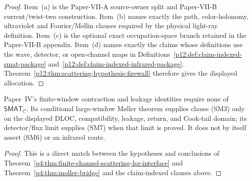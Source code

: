 \documentclass[12pt,a4paper]{article}
\begin{document}
\begin{proof}
Item~(a) is the Paper-VII-A source-owner split and Paper-VII-B current/twist-two
construction.  Item~(b) names exactly the path, color-holonomy, ultraviolet and
Fourier/Mellin clauses required by the physical light-ray definition.  Item~(c)
is the optional exact occupation-space branch retained in the Paper-VII-B
appendix.  Item~(d) names exactly the claims whose definitions use the wave,
detector, or open-channel maps in
Definitions~\ref{p12:def:claim-indexed-smat-package}
and~\ref{p12:def:claim-indexed-infrared-package}.  Theorem~\ref{p12:thm:scattering-hypothesis-firewall}
therefore gives the displayed allocation.
\end{proof}

\begin{corollary}
\label{p12:cor:paper-iv-scattering-import}
Paper~IV's finite-window contraction and leakage identities require none of
\(\mathsf{SMAT}_{\mathcal C}\).  Its conditional large-window M\o ller theorem
supplies clause \textnormal{(SM3)} only on the displayed DLOC, compatibility,
leakage, return, and Cook-tail domain; its detector/flux limit supplies
\textnormal{(SM7)} when that limit is proved.  It does not by itself assert
\textnormal{(SM6)} or an infrared route.
\end{corollary}

\begin{proof}
This is a direct match between the hypotheses and conclusions of
Theorem~\ref{p4:thm:finite-channel-scattering-lsz-interface} and
Theorem~\ref{p4:thm:moller-bridge} and the claim-indexed clauses above.
\end{proof}
\end{document}
